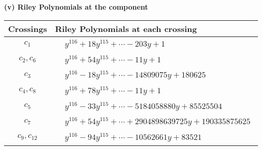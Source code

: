 \documentclass[1p]{elsarticle_modified}
\theoremstyle{definition}
\begin{document}
\newpage\renewcommand{\arraystretch}{1}
\flushleft \textbf{(v) Riley Polynomials at the component}\newline \\
\begin{tabular}{m{50pt}|m{274pt}}
Crossings & \hspace{64pt}Riley Polynomials at each crossing \\
\hline $$\begin{aligned}c_{1}\end{aligned}$$&$\begin{aligned}
&y^{116}+18 y^{115}+\cdots-203 y+1
\end{aligned}$\\
\hline $$\begin{aligned}c_{2},c_{6}\end{aligned}$$&$\begin{aligned}
&y^{116}+54 y^{115}+\cdots-11 y+1
\end{aligned}$\\
\hline $$\begin{aligned}c_{3}\end{aligned}$$&$\begin{aligned}
&y^{116}-18 y^{115}+\cdots-14809075 y+180625
\end{aligned}$\\
\hline $$\begin{aligned}c_{4},c_{8}\end{aligned}$$&$\begin{aligned}
&y^{116}+78 y^{115}+\cdots-11 y+1
\end{aligned}$\\
\hline $$\begin{aligned}c_{5}\end{aligned}$$&$\begin{aligned}
&y^{116}-33 y^{115}+\cdots-5184058880 y+85525504
\end{aligned}$\\
\hline $$\begin{aligned}c_{7}\end{aligned}$$&$\begin{aligned}
&y^{116}+54 y^{115}+\cdots+2904898639725 y+190335875625
\end{aligned}$\\
\hline $$\begin{aligned}c_{9},c_{12}\end{aligned}$$&$\begin{aligned}
&y^{116}-94 y^{115}+\cdots-10562661 y+83521
\end{aligned}$\\

\end{tabular}
\end{document}
